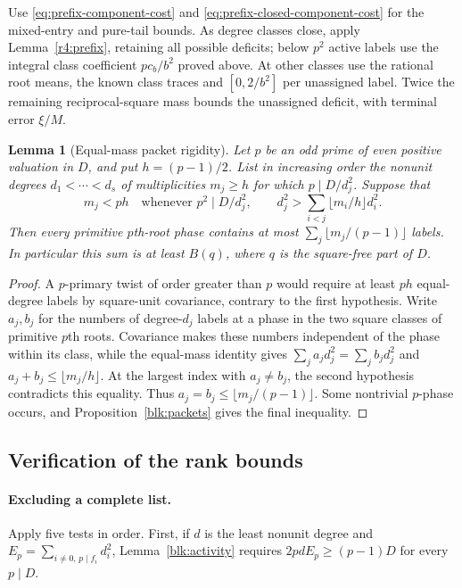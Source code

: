 \documentclass[11pt]{amsart}
\numberwithin{equation}{section}
\newtheorem{lemma}[theorem]{Lemma}
\theoremstyle{definition}
\theoremstyle{plain}
\begin{document}
Use \eqref{eq:prefix-component-cost} and
\eqref{eq:prefix-closed-component-cost} for the mixed-entry and
pure-tail bounds. As degree classes close, apply
Lemma~\ref{r4:prefix}, retaining all possible deficits; below
$p^2$ active labels use the integral class coefficient $pc_b/b^2$
proved above. At other classes use the rational root means, the
known class traces and $[0,2/b^2]$ per unassigned label. Twice the
remaining reciprocal-square mass bounds the unassigned deficit,
with terminal error $\xi/M$.

\begin{lemma}[Equal-mass packet rigidity]\label{new:packet-rigidity}
Let $p$ be an odd prime of even positive valuation in $D$, and put
$h=(p-1)/2$. List in increasing order the nonunit degrees
$d_1<\cdots<d_s$ of multiplicities $m_j\ge h$ for which
$p\mid D/d_j^2$. Suppose that
\[
 m_j<ph\quad\text{whenever }p^2\mid D/d_j^2,
 \qquad
 d_j^2>\sum_{i<j}\lfloor m_i/h\rfloor d_i^2.
\]
Then every primitive $p$th-root phase contains at most
$\sum_j\lfloor m_j/(p-1)\rfloor$ labels. In particular this sum
is at least $B(q)$, where $q$ is the square-free part of $D$.
\end{lemma}
\begin{proof}
A $p$-primary twist of order greater than $p$ would require
at least $ph$ equal-degree labels by square-unit covariance,
contrary to the first hypothesis. Write $a_j,b_j$ for the
numbers of degree-$d_j$ labels at a phase in the two square classes
of primitive $p$th roots. Covariance makes these numbers independent
of the phase within its class, while the equal-mass identity gives
$\sum_j a_jd_j^2=\sum_j b_jd_j^2$ and
$a_j+b_j\le\lfloor m_j/h\rfloor$.
At the largest index with $a_j\ne b_j$, the second hypothesis
contradicts this equality. Thus $a_j=b_j\le\lfloor m_j/(p-1)\rfloor$.
Some nontrivial $p$-phase occurs, and Proposition~\ref{blk:packets}
gives the final inequality.
\end{proof}

\subsection{Verification of the rank bounds}\label{sec:finish}


\paragraph{Excluding a complete list.}
Apply five tests in order. First, if $d$ is the least nonunit degree and
$E_p=\sum_{i\ne0,\,p\mid f_i}d_i^2$, Lemma~\ref{blk:activity} requires
$2pdE_p\ge(p-1)D$ for every $p\mid D$.
\end{document}
